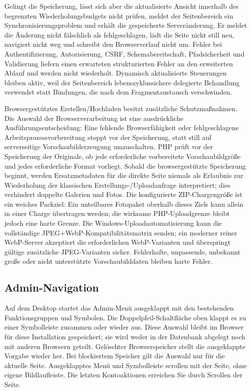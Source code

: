 \documentclass[11pt,a4paper]{article}
\begin{document}
Gelingt die Speicherung, lässt sich aber die aktualisierte Ansicht innerhalb des
begrenzten Wiederholungsbudgets nicht prüfen, meldet der Seitenbereich ein
Synchronisierungsproblem und erhält die gespeicherte Serveränderung. Er meldet
die Änderung nicht fälschlich als fehlgeschlagen, lädt die Seite nicht still
neu, navigiert nicht weg und schreibt den Browserverlauf nicht um. Fehler bei
Authentifizierung, Autorisierung, CSRF, Schemabereitschaft, Pfadsicherheit und
Validierung liefern einen erwarteten strukturierten Fehler an den erweiterten
Ablauf und werden nicht wiederholt. Dynamisch aktualisierte Steuerungen bleiben
aktiv, weil der Seitenbereich lebenszyklussichere delegierte Behandlung
verwendet statt Bindungen, die nach dem Fragmentaustausch verschwinden.

Browsergestütztes Erstellen/Hochladen besitzt zusätzliche Schutzmaßnahmen. Die
Auswahl der Browserverarbeitung ist eine ausdrückliche Ausführungsentscheidung:
Eine fehlende Browserfähigkeit oder fehlgeschlagene Arbeitsprozessvorbereitung
stoppt vor der Speicherung, statt still auf serverseitige Vorschaubilderzeugung
umzuschalten. PHP prüft vor der Speicherung der Originale, ob jede erforderliche
vorbereitete Vorschaubildgröße und jedes erforderliche Format vorliegt. Sobald
die browsergestützte Speicherung beginnt, werden Ersatzmetadaten für die direkte
Seite niemals als Erlaubnis zur Wiederholung der klassischen
Erstellungs-/Uploadanfrage interpretiert; dies verhindert doppelte Galerien und
Fotos. Die konfigurierte ZIP-Chargengröße ist ein weiches Packziel: Ein
unteilbares Fotopaket oberhalb dieses Ziels kann allein in einer Charge
übertragen werden; die wirksame PHP-Uploadgrenze bleibt jedoch eine harte
Grenze. Die Windows-Uploadautomatisierung kann die vollständige
JPEG+WebP-Kompatibilitätsmatrix senden; ein moderner reiner WebP-Server
akzeptiert die erforderlichen WebP-Varianten und überspringt gültige zusätzliche
JPEG-Varianten sicher. Fehlerhafte, unpassende, unbekannt große oder nicht
unterstützte Vorschaubilddaten bleiben harte Fehler.

\subsection{Admin-Navigation}

Auf dem Desktop startet das Admin-Menü ausgeklappt mit den bestehenden
Funktionsgruppen und Symbolen. Die Doppelpfeil-Schaltfläche oben klappt es zu
einer Symbolleiste zusammen oder wieder aus. Diese Auswahl bleibt im Browser
für diese Installation gespeichert; sie wird weder in der Datenbank abgelegt
noch mit anderen Browsern geteilt. Gelöschter Browserspeicher stellt die
ausgeklappte Vorgabe wieder her. Bei blockiertem Speicher gilt die Auswahl nur
für die aktuelle Seite. Ausgeklapptes Menü und Symbolleiste scrollen mit der
Seite, ohne eigene Bildlaufleiste. Die letzten Kontoaktionen erreichen Sie durch
Scrollen der Seite.
\end{document}

